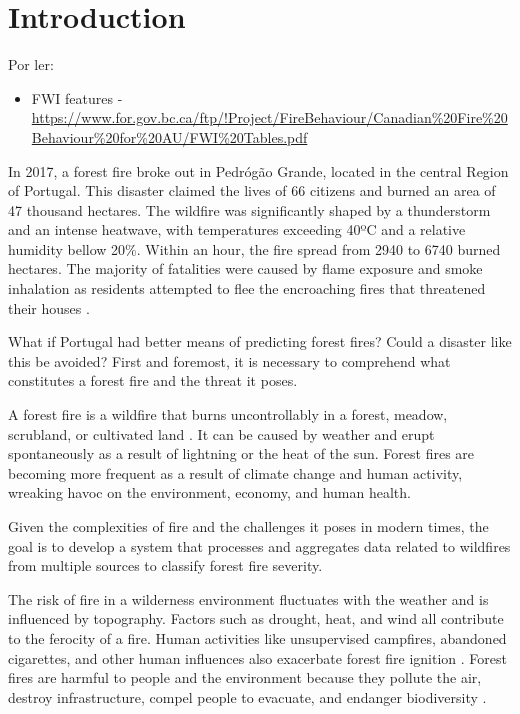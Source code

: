 \chapter{Introduction}

Por ler:
\begin{itemize}
    \item FWI features - \url{https://www.for.gov.bc.ca/ftp/!Project/FireBehaviour/Canadian%20Fire%20Behaviour%20for%20AU/FWI%20Tables.pdf}
\end{itemize}





\label{sec:introduction}

In 2017, a forest fire broke out in Pedrógão Grande, located in the central Region of Portugal. This disaster claimed the lives of 66 citizens and burned an area of 47 thousand hectares. The wildfire was significantly shaped by a thunderstorm and an intense heatwave, with temperatures exceeding 40ºC and a relative humidity bellow 20\%. Within an hour, the fire spread from 2940 to 6740 burned hectares. The majority of fatalities were caused by flame exposure and smoke inhalation as residents attempted to flee the encroaching fires that threatened their houses \cite{viegas2018wildfires}. 


What if Portugal had better means of predicting forest fires? Could a disaster like this be avoided? First and foremost, it is necessary to comprehend what constitutes a forest fire and the threat it poses. 


A forest fire is a wildfire that burns uncontrollably in a forest, meadow, scrubland, or cultivated land \cite{britannica2023wildfire}. It can be caused by weather and erupt spontaneously as a result of lightning or the heat of the sun. Forest fires are becoming more frequent as a result of climate change and human activity, wreaking havoc on the environment, economy, and human health.


Given the complexities of fire and the challenges it poses in modern times, the goal is to develop a system that processes and aggregates data related to wildfires from multiple sources to classify forest fire severity.


The risk of fire in a wilderness environment fluctuates with the weather and is influenced by topography. Factors such as drought, heat, and wind all contribute to the ferocity of a fire. Human activities like unsupervised campfires, abandoned cigarettes, and other human influences also exacerbate forest fire ignition \cite{britannica2023wildfire, 10010889, EOSDA2023, arif2021role}. Forest fires are harmful to people and the environment because they pollute the air, destroy infrastructure, compel people to evacuate, and endanger biodiversity \cite{WorldEconomicForum2023}.


